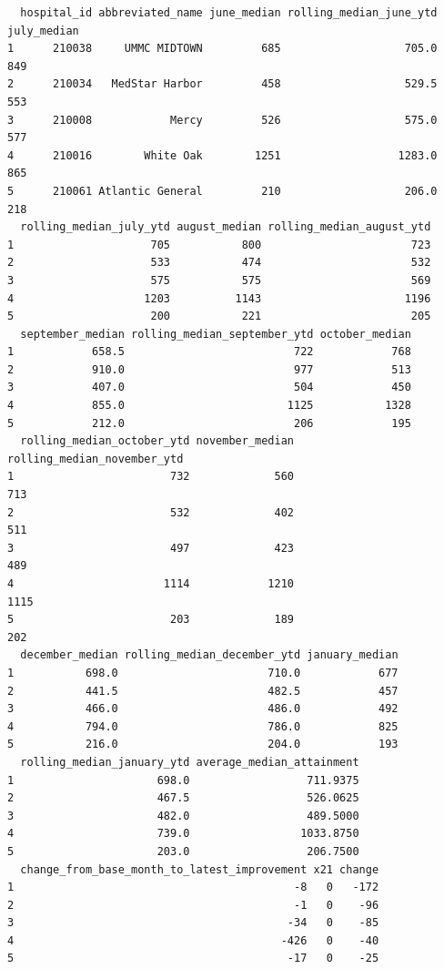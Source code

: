 \documentclass[
  letterpaper,
  DIV=11,
  numbers=noendperiod]{scrartcl}
\begin{document}
\begin{verbatim}
  hospital_id abbreviated_name june_median rolling_median_june_ytd july_median
1      210038     UMMC MIDTOWN         685                   705.0         849
2      210034   MedStar Harbor         458                   529.5         553
3      210008            Mercy         526                   575.0         577
4      210016        White Oak        1251                  1283.0         865
5      210061 Atlantic General         210                   206.0         218
  rolling_median_july_ytd august_median rolling_median_august_ytd
1                     705           800                       723
2                     533           474                       532
3                     575           575                       569
4                    1203          1143                      1196
5                     200           221                       205
  september_median rolling_median_september_ytd october_median
1            658.5                          722            768
2            910.0                          977            513
3            407.0                          504            450
4            855.0                         1125           1328
5            212.0                          206            195
  rolling_median_october_ytd november_median rolling_median_november_ytd
1                        732             560                         713
2                        532             402                         511
3                        497             423                         489
4                       1114            1210                        1115
5                        203             189                         202
  december_median rolling_median_december_ytd january_median
1           698.0                       710.0            677
2           441.5                       482.5            457
3           466.0                       486.0            492
4           794.0                       786.0            825
5           216.0                       204.0            193
  rolling_median_january_ytd average_median_attainment
1                      698.0                  711.9375
2                      467.5                  526.0625
3                      482.0                  489.5000
4                      739.0                 1033.8750
5                      203.0                  206.7500
  change_from_base_month_to_latest_improvement x21 change
1                                           -8   0   -172
2                                           -1   0    -96
3                                          -34   0    -85
4                                         -426   0    -40
5                                          -17   0    -25
\end{verbatim}
\end{document}
